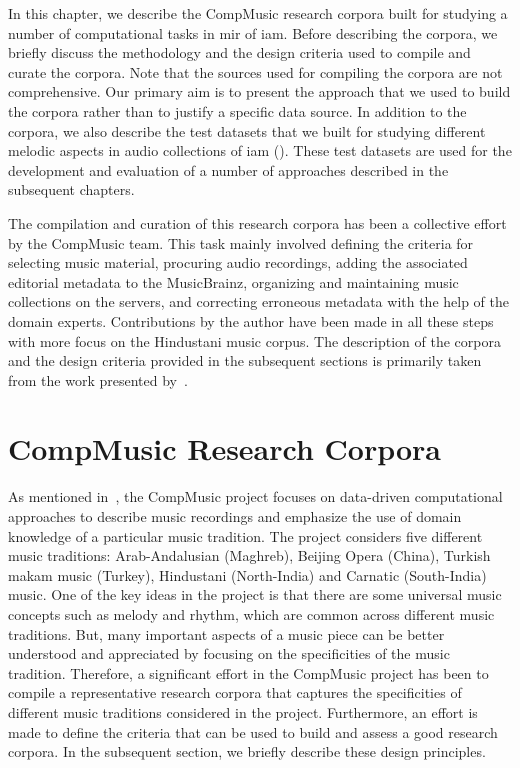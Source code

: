 In this chapter, we describe the CompMusic research corpora built for studying a number of computational tasks in \gls{mir} of \gls{iam}. Before describing the corpora, we briefly discuss the methodology and the design criteria used to compile and curate the corpora. Note that the sources used for compiling the corpora are not comprehensive. Our primary aim is to present the approach that we used to build the corpora rather than to justify a specific data source. In addition to the corpora, we also describe the test datasets that we built for studying different melodic aspects in audio collections of \gls{iam} (). These test datasets are used for the development and evaluation of a number of approaches described in the subsequent chapters. 

The compilation and curation of this research corpora has been a collective effort by the CompMusic team. This task mainly involved defining the criteria for selecting music material, procuring audio recordings, adding the associated editorial metadata to the MusicBrainz, organizing and maintaining music collections on the servers, and correcting erroneous metadata with the help of the domain experts. Contributions by the author have been made in all these steps with more focus on the Hindustani music corpus. The description of the corpora and the design criteria provided in the subsequent sections is primarily taken from the work presented by~\cite{CM_Corpora_Ajay14,serra:14:corpus}.


\section{CompMusic Research Corpora}
\label{sec:corpus_compmusic_research_corpora}

As mentioned in~, the CompMusic project focuses on data-driven computational approaches to describe music recordings and emphasize the use of domain knowledge of a particular music tradition. The project considers five different music traditions: Arab-Andalusian (Maghreb), Beijing Opera (China), Turkish makam music (Turkey), Hindustani (North-India) and Carnatic (South-India) music. One of the key ideas in the project is that there are some universal music concepts such as melody and rhythm, which are common across different music traditions. But, many important aspects of a music piece can be better understood and appreciated by focusing on the specificities of the music tradition. Therefore, a significant effort in the CompMusic project has been to compile a representative research corpora that captures the specificities of different music traditions considered in the project. Furthermore, an effort is made to define the criteria that can be used to build and assess a good research corpora. In the subsequent section, we briefly describe these design principles.

